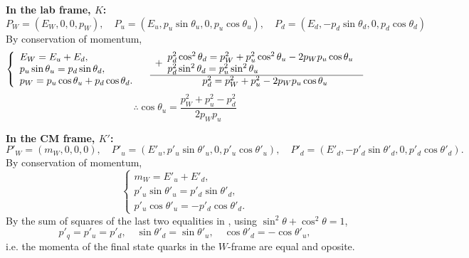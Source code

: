 \documentclass[12pt]{article}
\begin{document}
{\bf In the lab frame, $K$:}
\begin{equation}\label{eq:pLab}
  P_W = (E_W,0,0,p_W), \quad
  P_u = (E_u,p_u\sin\theta_u,0,p_u\cos\theta_u), \quad
  P_d = (E_d,-p_d\sin\theta_d,0,p_d\cos\theta_d)
\end{equation}
%
By conservation of momentum,
\begin{equation}\label{eq:consLab}
  \left\{\begin{array}{l}
    E_W = E_u + E_d, \\
    p_u\sin\theta_u = p_d\sin\theta_d, \\
    p_W = p_u\cos\theta_u + p_d\cos\theta_d.
  \end{array}\right.
  \quad
  \begin{array}{l}
    +\begin{array}{l}
      p_d^2\cos^2\theta_d = p_W^2 + p_u^2\cos^2\theta_u - 2p_Wp_u\cos\theta_u \\
      p_d^2\sin^2\theta_d = p_u^2\sin^2\theta_u
    \end{array} \\
    \hline
    \hspace{17mm} p_d^2 = p_W^2 + p_u^2 - 2p_Wp_u\cos\theta_u
  \end{array}
\end{equation}
%
\begin{equation}\label{eq:cos}
  \therefore
  \cos\theta_u = \frac{p_W^2 + p_u^2 - p_d^2}{2p_Wp_u}
\end{equation}


{\bf In the CM frame, $K'$:}
\begin{equation}\label{eq:pCM}
  P'_W = (m_W,0,0,0), \quad
  P'_u = (E'_u,p'_u\sin\theta'_u,0,p'_u\cos\theta'_u), \quad
  P'_d = (E'_d,-p'_d\sin\theta'_d,0,p'_d\cos\theta'_d).
\end{equation}
%
By conservation of momentum,
\begin{equation}\label{eq:consCM}
  \left\{\begin{array}{l}
    m_W = E'_u + E'_d, \\
    p'_u\sin\theta'_u = p'_d\sin\theta'_d, \\
    p'_u\cos\theta'_u =-p'_d\cos\theta'_d.
  \end{array}\right.
\end{equation}
%
By the sum of squares of the last two equalities in , using
$\sin^2\theta + \cos^2\theta = 1$,
\begin{equation}\label{eq:eqmom}
  p'_q = p'_{u} = p'_{d}, \quad
  \sin\theta'_d =  \sin\theta'_u, \quad
  \cos\theta'_d = -\cos\theta'_u,
\end{equation}
i.e. the momenta of the final state quarks in the $W$-frame are equal and oposite.
\end{document}
